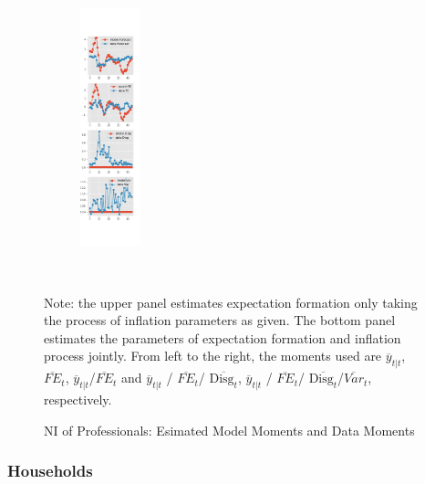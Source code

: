 \documentclass[]{article}
\begin{document}
\begin{figure}[ht]
\begin{subfigure}[b]{\textwidth}
		\includegraphics[width=0.19\textwidth]{figures/spf_ni_est_joint_diag4.png}
	\end{subfigure}
	\\
	\begin{flushleft}
		{\footnotesize Note: the upper panel estimates expectation formation only taking the process of inflation parameters as given. The bottom panel estimates the parameters of expectation formation and inflation process jointly. From left to the right, the moments used are $\overline y_{t|t}$, $\overline{FE}_{t}$, $\overline y_{t|t}$/$\overline{FE}_{t}$ and $\overline y_{t|t}$ / $\overline{FE}_{t}$/ $\overline{\textrm{Disg}_t}$, $\overline y_{t|t}$ / $\overline{FE}_{t}$/ $\overline{\textrm{Disg}_t}$/$\overline{Var}_t$,  respectively. }
	\end{flushleft}
	\caption{NI of Professionals: Esimated Model Moments and Data Moments}
\end{figure}

\subsubsection{Households}
\end{document}
